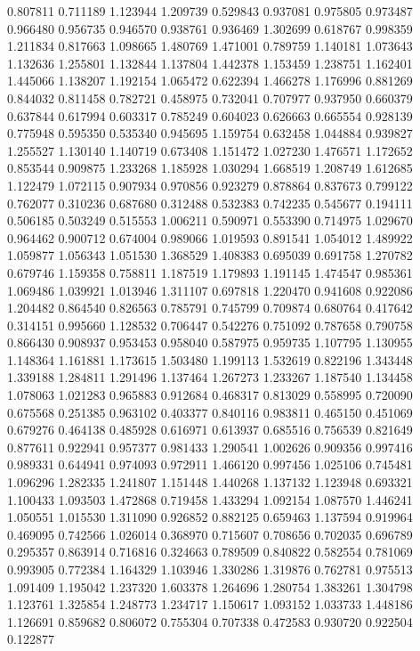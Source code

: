 0.807811
0.711189
1.123944
1.209739
0.529843
0.937081
0.975805
0.973487
0.966480
0.956735
0.946570
0.938761
0.936469
1.302699
0.618767
0.998359
1.211834
0.817663
1.098665
1.480769
1.471001
0.789759
1.140181
1.073643
1.132636
1.255801
1.132844
1.137804
1.442378
1.153459
1.238751
1.162401
1.445066
1.138207
1.192154
1.065472
0.622394
1.466278
1.176996
0.881269
0.844032
0.811458
0.782721
0.458975
0.732041
0.707977
0.937950
0.660379
0.637844
0.617994
0.603317
0.785249
0.604023
0.626663
0.665554
0.928139
0.775948
0.595350
0.535340
0.945695
1.159754
0.632458
1.044884
0.939827
1.255527
1.130140
1.140719
0.673408
1.151472
1.027230
1.476571
1.172652
0.853544
0.909875
1.233268
1.185928
1.030294
1.668519
1.208749
1.612685
1.122479
1.072115
0.907934
0.970856
0.923279
0.878864
0.837673
0.799122
0.762077
0.310236
0.687680
0.312488
0.532383
0.742235
0.545677
0.194111
0.506185
0.503249
0.515553
1.006211
0.590971
0.553390
0.714975
1.029670
0.964462
0.900712
0.674004
0.989066
1.019593
0.891541
1.054012
1.489922
1.059877
1.056343
1.051530
1.368529
1.408383
0.695039
0.691758
1.270782
0.679746
1.159358
0.758811
1.187519
1.179893
1.191145
1.474547
0.985361
1.069486
1.039921
1.013946
1.311107
0.697818
1.220470
0.941608
0.922086
1.204482
0.864540
0.826563
0.785791
0.745799
0.709874
0.680764
0.417642
0.314151
0.995660
1.128532
0.706447
0.542276
0.751092
0.787658
0.790758
0.866430
0.908937
0.953453
0.958040
0.587975
0.959735
1.107795
1.130955
1.148364
1.161881
1.173615
1.503480
1.199113
1.532619
0.822196
1.343448
1.339188
1.284811
1.291496
1.137464
1.267273
1.233267
1.187540
1.134458
1.078063
1.021283
0.965883
0.912684
0.468317
0.813029
0.558995
0.720090
0.675568
0.251385
0.963102
0.403377
0.840116
0.983811
0.465150
0.451069
0.679276
0.464138
0.485928
0.616971
0.613937
0.685516
0.756539
0.821649
0.877611
0.922941
0.957377
0.981433
1.290541
1.002626
0.909356
0.997416
0.989331
0.644941
0.974093
0.972911
1.466120
0.997456
1.025106
0.745481
1.096296
1.282335
1.241807
1.151448
1.440268
1.137132
1.123948
0.693321
1.100433
1.093503
1.472868
0.719458
1.433294
1.092154
1.087570
1.446241
1.050551
1.015530
1.311090
0.926852
0.882125
0.659463
1.137594
0.919964
0.469095
0.742566
1.026014
0.368970
0.715607
0.708656
0.702035
0.696789
0.295357
0.863914
0.716816
0.324663
0.789509
0.840822
0.582554
0.781069
0.993905
0.772384
1.164329
1.103946
1.330286
1.319876
0.762781
0.975513
1.091409
1.195042
1.237320
1.603378
1.264696
1.280754
1.383261
1.304798
1.123761
1.325854
1.248773
1.234717
1.150617
1.093152
1.033733
1.448186
1.126691
0.859682
0.806072
0.755304
0.707338
0.472583
0.930720
0.922504
0.122877
